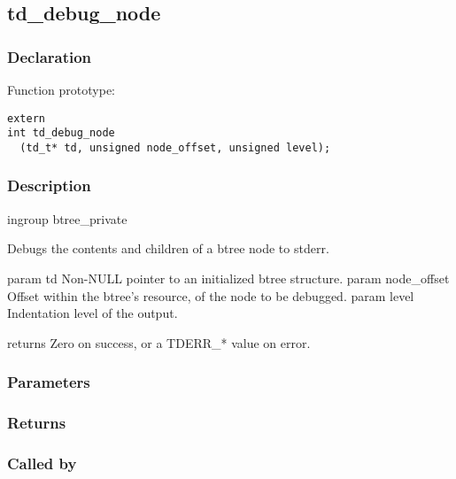 
\newpage
\subsection{td\_debug\_node}
\subsubsection{Declaration} Function prototype:

\begin{verbatim}
extern
int td_debug_node
  (td_t* td, unsigned node_offset, unsigned level);
\end{verbatim}

\subsubsection{Description}


 ingroup btree\_private

 Debugs the contents and children of a btree node to stderr.

 param td Non-NULL pointer to an initialized btree structure.
 param node\_offset Offset within the btree's resource, of the node
 to be debugged.
 param level Indentation level of the output.

 returns Zero on success, or a TDERR\_* value on error.
 

\subsubsection{Parameters}
\subsubsection{Returns}
\subsubsection{Called by}
